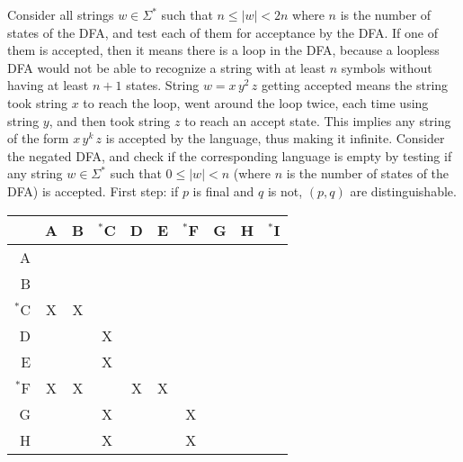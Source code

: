 \documentclass[docid=TP07]{tcom_TP}
\begin{document}
{Consider all strings $w \in \Sigma^*$ such that $n \leq |w| < 2n$ where $n$ is the number of states of the DFA, and test each of them for acceptance by the DFA. If one of them is accepted, then it means there is a loop in the DFA, because a loopless DFA would not be able to recognize a string with at least $n$ symbols without having at least $n+1$ states. String $w=x\,y^2\,z$ getting accepted means the string took string $x$ to reach the loop, went around the loop twice, each time using string $y$, and then took string $z$ to reach an accept state. This implies any string of the form $x\,y^k\,z$ is accepted by the language, thus making it infinite.
Consider the negated DFA, and check if the corresponding language is empty by testing if any string $w \in \Sigma^*$ such that $0 \leq |w| < n$ (where $n$ is the number of states of the DFA) is accepted.
First step: if $p$ is final and $q$ is not, $(p,q)$ are distinguishable.
\begin{center} \begin{tabular}{r || c | c | c | c | c | c | c | c | c}
	   & A  & B  & $^*$C & D  & E  & $^*$F & G  & H  & $^*$I \\ \hline \hline
	A  & \cellcolor{gray} & \cellcolor{gray} & \cellcolor{gray} & \cellcolor{gray} & \cellcolor{gray} & \cellcolor{gray} & \cellcolor{gray} & \cellcolor{gray} & \cellcolor{gray} \\ \hline
	B  &    & \cellcolor{gray} & \cellcolor{gray} & \cellcolor{gray} & \cellcolor{gray} & \cellcolor{gray} & \cellcolor{gray} & \cellcolor{gray} & \cellcolor{gray} \\ \hline
	$^*$C & X  & X  & \cellcolor{gray} & \cellcolor{gray} & \cellcolor{gray} & \cellcolor{gray} & \cellcolor{gray} & \cellcolor{gray} & \cellcolor{gray} \\ \hline
	D  &    &    & X  & \cellcolor{gray} & \cellcolor{gray} & \cellcolor{gray} & \cellcolor{gray} & \cellcolor{gray} & \cellcolor{gray} \\ \hline
	E  &    &    & X  &    & \cellcolor{gray} & \cellcolor{gray} & \cellcolor{gray} & \cellcolor{gray} & \cellcolor{gray} \\ \hline
	$^*$F & X  & X  &    & X  & X  & \cellcolor{gray} & \cellcolor{gray} & \cellcolor{gray} & \cellcolor{gray} \\ \hline
	G  &    &    & X  &    &    & X  & \cellcolor{gray} & \cellcolor{gray} & \cellcolor{gray} \\ \hline
	H  &    &    & X  &    &    & X  &    & \cellcolor{gray} & \cellcolor{gray} \\ \hline

\end{tabular}
\end{center}}
\end{document}
